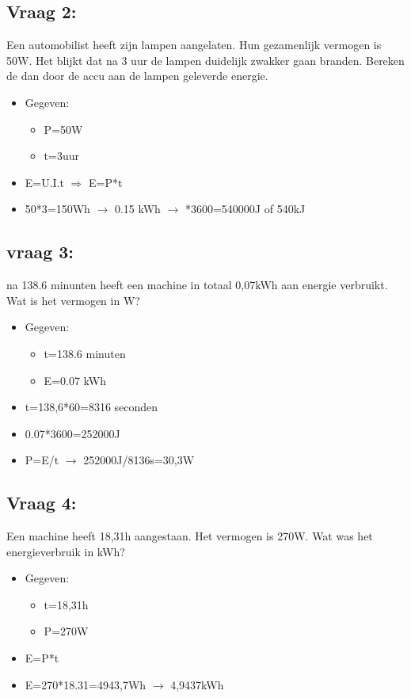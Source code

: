 \documentclass[12pt]{article}
\begin{document}
\subsection{Vraag 2:}
Een automobilist heeft zijn lampen aangelaten. Hun gezamenlijk vermogen is 50W. Het blijkt dat na 3 uur de lampen duidelijk zwakker gaan branden. Bereken de dan door de accu aan de lampen geleverde energie.
\begin{itemize}
    \item[] Gegeven:\begin{itemize}
        \item P=50W
        \item t=3uur
    \end{itemize}
\end{itemize}
\begin{itemize}
    \item E=U.I.t $\Rightarrow$ E=P*t
    \item 50*3=150Wh $\rightarrow$ 0.15 kWh $\rightarrow$ *3600=540000J of 540kJ
\end{itemize}
\subsection{vraag 3:}
na 138.6 minunten heeft een machine in totaal 0,07kWh aan energie verbruikt. Wat is het vermogen in W?
\begin{itemize}
    \item[] Gegeven:\begin{itemize}
        \item t=138.6 minuten
        \item E=0.07 kWh
    \end{itemize}
\end{itemize}
\begin{itemize}
    \item t=138,6*60=8316 seconden
    \item 0.07*3600=252000J
    \item P=E/t $\rightarrow$ 252000J/8136s=30,3W
\end{itemize}
\subsection{Vraag 4:}
Een machine heeft 18,31h aangestaan. Het vermogen is 270W. Wat was het energieverbruik in kWh?
\begin{itemize}
    \item[] Gegeven:\begin{itemize}
        \item t=18,31h
        \item P=270W
    \end{itemize}
\end{itemize}
\begin{itemize}
    \item E=P*t
    \item E=270*18.31=4943,7Wh $\rightarrow$ 4,9437kWh
\end{itemize}
\end{document}
